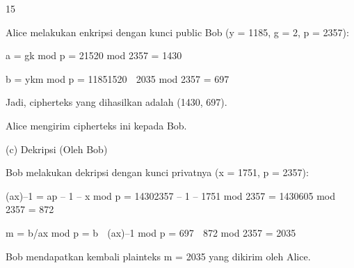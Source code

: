 \documentclass{article}
\begin{document}

15

Alice melakukan enkripsi dengan kunci public Bob (y = 1185, g = 2, p = 2357):


a = gk mod p = 21520 mod 2357 = 1430


b = ykm mod p = 11851520  2035 mod 2357 = 697

 Jadi, cipherteks yang dihasilkan adalah (1430, 697). 

 Alice mengirim cipherteks ini kepada Bob.

(c) Dekripsi (Oleh Bob)

  Bob melakukan dekripsi dengan kunci privatnya (x = 1751, p = 2357):


(ax)–1 = ap – 1 – x mod p  = 14302357 – 1 – 1751 mod 2357 = 1430605 mod 2357 = 872


m = b/ax mod p  = b  (ax)–1 mod p = 697  872 mod 2357 = 2035

     Bob mendapatkan kembali plainteks m = 2035 yang dikirim oleh Alice.
\end{document}
